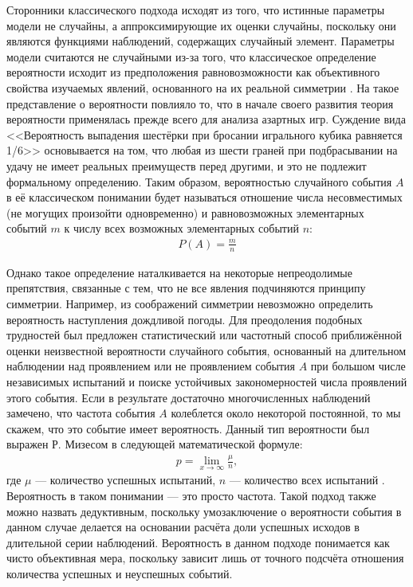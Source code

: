 Сторонники классического подхода исходят из того, что истинные параметры модели не случайны, а аппроксимирующие их оценки случайны, поскольку они являются функциями наблюдений, содержащих случайный элемент. \cite[стр. 5-6]{Zellner1980} Параметры модели считаются не случайными из-за того, что классическое определение вероятности исходит из предположения равновозможности как объективного свойства изучаемых явлений, основанного на их реальной симметрии \cite[стр. 24]{Gnedenko2005}. На такое представление о вероятности повлияло то, что в начале своего развития теория вероятности применялась прежде всего для анализа азартных игр. Суждение вида <<Вероятность выпадения шестёрки при бросании игрального кубика равняется 1/6>> основывается на том, что любая из шести граней при подбрасывании на удачу не имеет реальных преимуществ перед другими, и это не подлежит формальному определению. Таким образом, вероятностью случайного события $A$ в её классическом понимании будет называться отношение числа несовместимых (не могущих произойти одновременно) и равновозможных элементарных событий $m$ к числу всех возможных элементарных событий $n$:
\begin{eqnarray}
P(A)=\frac{m}{n}
\end{eqnarray}

Однако такое определение наталкивается на некоторые непреодолимые препятствия, связанные с тем, что не все явления подчиняются принципу симметрии. Например, из соображений симметрии невозможно определить вероятность наступления дождливой погоды. Для преодоления подобных трудностей был предложен статистический или частотный способ приближённой оценки неизвестной вероятности случайного события, основанный на длительном наблюдении над проявлением или не проявлением события $A$ при большом числе независимых испытаний и поиске устойчивых закономерностей числа проявлений этого события. Если в результате достаточно многочисленных наблюдений замечено, что частота события $A$ колеблется около некоторой постоянной, то мы скажем, что это событие имеет вероятность. Данный тип вероятности был выражен Р. Мизесом в следующей математической формуле:
\begin{eqnarray}
p=\lim_{x\to\infty}\frac{\mu}{n},
\end{eqnarray}
где $\mu$ --- количество успешных испытаний, $n$ --- количество всех испытаний \cite[стр. 46-47]{Gnedenko2005}. Вероятность в таком понимании --- это просто частота. Такой подход также можно назвать дедуктивным, поскольку умозаключение о вероятности события в данном случае делается на основании расчёта доли успешных исходов в длительной серии наблюдений.  Вероятность в данном подходе понимается как чисто объективная мера, поскольку зависит лишь от точного подсчёта отношения количества успешных и неуспешных событий. 

